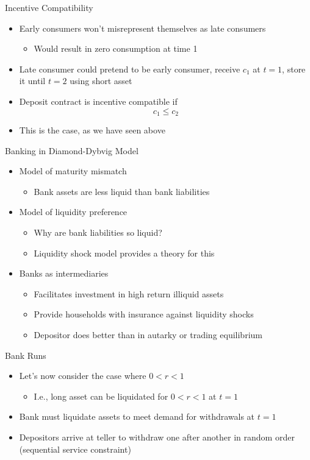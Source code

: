 \documentclass[11pt,aspectratio=169,xcolor={dvipsnames},hyperref={pdftex,pdfpagemode=UseNone,hidelinks,pdfdisplaydoctitle=true},usepdftitle=false]{beamer}
\begin{document}
\begin{frame}{Incentive Compatibility}
\begin{itemize}
	\itemsep1em 
	\item Early consumers won't misrepresent themselves as late consumers
	\begin{itemize}
		\item Would result in zero consumption at time 1
	\end{itemize}
	\item Late consumer could pretend to be early consumer, receive $c_1$ at $t=1$, store it until $t=2$ using short asset
	\item Deposit contract is incentive compatible if
	\[ c_1 \leq c_2 \]
	\item This is the case, as we have seen above
\end{itemize}
\end{frame}


\begin{frame}{Banking in Diamond-Dybvig Model}
\begin{itemize}
	\itemsep1em 
	\item Model of maturity mismatch
	\begin{itemize}
		\item Bank assets are less liquid than bank liabilities
	\end{itemize}
	\item Model of liquidity preference
	\begin{itemize}
		\item Why are bank liabilities so liquid?
		\item Liquidity shock model provides a theory for this
	\end{itemize}
	\item Banks as intermediaries
	\begin{itemize}
		\item Facilitates investment in high return illiquid assets
		\item Provide households with insurance against liquidity shocks
		\item Depositor does better than in autarky or trading equilibrium
	\end{itemize}
\end{itemize}
\end{frame}


\begin{frame}{Bank Runs}
\begin{itemize}
	\itemsep1em 
	\item Let's now consider the case where $0 < r < 1$
	\begin{itemize}
		\item I.e., long asset can be liquidated for $0 < r < 1$ at $t=1$  
	\end{itemize}
	\item Bank must liquidate assets to meet demand for withdrawals at $t=1$
	\item Depositors arrive at teller to withdraw one after another in random order \\ (sequential service constraint)
\end{itemize}
\end{frame}
\end{document}
